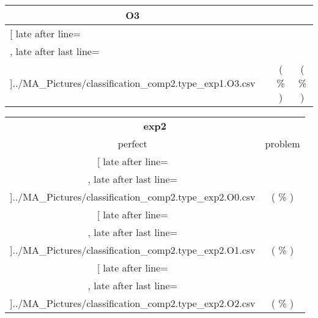 \begin{table}[!htbp]
{\begin{tabular}{l|c|c|c}
\multicolumn{1}{c}{\bfseries O3}
	\\\midrule
	\csvreader[ late after line=\\, late after last line=\\\bottomrule]{../MA_Pictures/classification_comp2.type_exp1.O3.csv}{
}
	{\csvcolii  &  \csvcolxii & \csvcolxiii ( \csvcolxiv \% ) & \csvcolxv ( \csvcolxvi \% )}%


    	\end{tabular}

	\begin{tabular}{|c|c}%

	\toprule
    \multicolumn{2}{c}{\bfseries exp2}\\
	
	     perfect &  problem %
	\\\midrule
	\csvreader[ late after line=\\, late after last line=\\\midrule]{../MA_Pictures/classification_comp2.type_exp2.O0.csv}{
}
	{\csvcolxiii ( \csvcolxiv \% ) & \csvcolxv ( \csvcolxvi \% )}%
\multicolumn{1}{c}{}

	\\\midrule
	\csvreader[ late after line=\\, late after last line=\\\midrule]{../MA_Pictures/classification_comp2.type_exp2.O1.csv}{
}
	{\csvcolxiii ( \csvcolxiv \% ) & \csvcolxv ( \csvcolxvi \% )}%
	
	\multicolumn{1}{c}{}

	\\\midrule
	\csvreader[ late after line=\\, late after last line=\\\midrule]{../MA_Pictures/classification_comp2.type_exp2.O2.csv}{
}
	{\csvcolxiii ( \csvcolxiv \% ) & \csvcolxv ( \csvcolxvi \% )}%
	

\end{tabular}}
\end{table}
